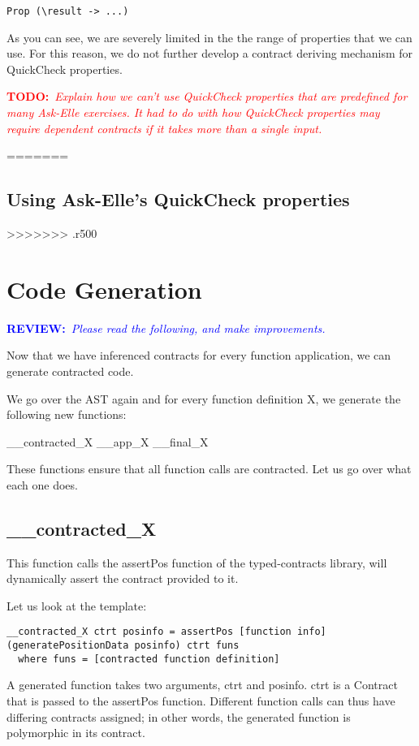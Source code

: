 \documentclass[10pt,a4paper]{article}
\newcommand{\annotate}[3]{
	\begin{scriptsize}
	\textcolor{#1}{\textbf{#2}~\textit{#3}}
	\end{scriptsize}\newline}
\newcommand{\todo}[1]{\annotate{red} {TODO:} {#1}}
\newcommand{\review}{\annotate{blue} {REVIEW:} {Please read the following, and make improvements. \newline}}
\begin{document}
\begin{lstlisting}
Prop (\result -> ...)
\end{lstlisting}

As you can see, we are severely limited in the the range of properties that we can use.
For this reason, we do not further develop a contract deriving mechanism for QuickCheck properties.
 
\todo {Explain how we can't use QuickCheck properties that are predefined for many Ask-Elle exercises. It had to do with how QuickCheck properties may require dependent contracts if it takes more than a single input.}

=======
\subsection{Using Ask-Elle's QuickCheck properties}


>>>>>>> .r500
\section{Code Generation}

\review

Now that we have inferenced contracts for every function application, we can generate contracted code.

We go over the AST again and for every function definition X, we generate the following new functions:

\_\_contracted\_X
\_\_app\_X
\_\_final\_X

These functions ensure that all function calls are contracted. Let us go over what each one does.

\subsection{\_\_contracted\_X}
This function calls the assertPos function of the typed-contracts library, will dynamically assert the contract provided to it.


Let us look at the template:

\begin{lstlisting}
__contracted_X ctrt posinfo = assertPos [function info] (generatePositionData posinfo) ctrt funs
  where funs = [contracted function definition]
\end{lstlisting}

A generated function takes two arguments, ctrt and posinfo.
ctrt is a Contract that is passed to the assertPos function. 
Different function calls can thus have differing contracts assigned;
in other words, the generated function is polymorphic in its contract.
\end{document}
